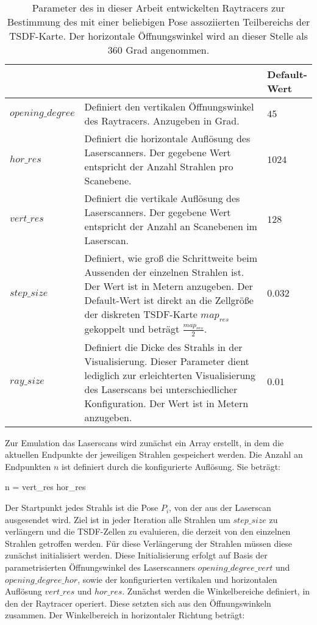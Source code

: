 	\begin{table}
		\centering
		\caption{Parameter des in dieser Arbeit entwickelten Raytracers zur Bestimmung des mit einer beliebigen Pose assoziierten Teilbereichs der TSDF-Karte. Der horizontale Öffnungswinkel wird an dieser Stelle als $360$ Grad angenommen.}
		\begin{tabular}{| p{3cm} | p{8cm} | p{2cm} |}
			\hline
			\thead{Parameter}   & \thead{Funktionsweise}  & \thead{Default-\\Wert}\\
			\hline
			$opening\_degree$   & Definiert den vertikalen Öffnungswinkel des Raytracers. Anzugeben in Grad. & $45$ \\
			\hline
			$hor\_res$     & Definiert die horizontale Auflösung des Laserscanners. Der gegebene Wert  entspricht der Anzahl Strahlen pro Scanebene. & $1024$\\
			\hline			
			$vert\_res$    & Definiert die vertikale Auflösung des Laserscanners. Der gegebene Wert entspricht der Anzahl an Scanebenen im Laserscan. & $128$\\
			\hline			
			$step\_size$      & Definiert, wie groß die Schrittweite beim Aussenden der einzelnen Strahlen ist. Der Wert ist in Metern anzugeben. Der Default-Wert ist direkt an die Zellgröße der diskreten TSDF-Karte $map_{res}$ gekoppelt und beträgt $\frac{map_{res}}{2}$. & $0.032$ \\
			\hline			
			$ray\_size$   & Definiert die Dicke des Strahls in der Visualisierung. Dieser Parameter dient lediglich zur erleichterten Visualisierung des Laserscans bei unterschiedlicher Konfiguration. Der Wert ist in Metern anzugeben. & $0.01$ \\
			\hline
		\end{tabular}
		\label{table:Raytracer_params}
	\end{table}	
	
Zur Emulation das Laserscans wird zunächst ein Array erstellt, in dem die aktuellen Endpunkte der jeweiligen Strahlen gespeichert werden. Die Anzahl an Endpunkten $n$ ist definiert durch die konfigurierte Auflösung. Sie beträgt:

\begin{myequation}
n = vert\_res \cdot hor\_res
\end{myequation}

 Der Startpunkt jedes Strahls ist die Pose $P_i$, von der aus der Laserscan ausgesendet wird. Ziel ist in jeder Iteration alle Strahlen um $step\_size$ zu verlängern und die TSDF-Zellen zu evaluieren, die derzeit von den einzelnen Strahlen getroffen werden. Für diese Verlängerung der Strahlen müssen diese zunächst initialisiert werden. Diese Initialisierung erfolgt auf Basis der parametrisierten Öffnungswinkel des Laserscanners $opening\_degree\_vert$ und $opening\_degree\_hor$, sowie der konfigurierten vertikalen und horizontalen Auflösung $vert\_res$ und $hor\_res$.
Zunächst werden die Winkelbereiche definiert, in den der Raytracer operiert. Diese setzten sich aus den Öffnungswinkeln zusammen. Der Winkelbereich in horizontaler Richtung beträgt:

